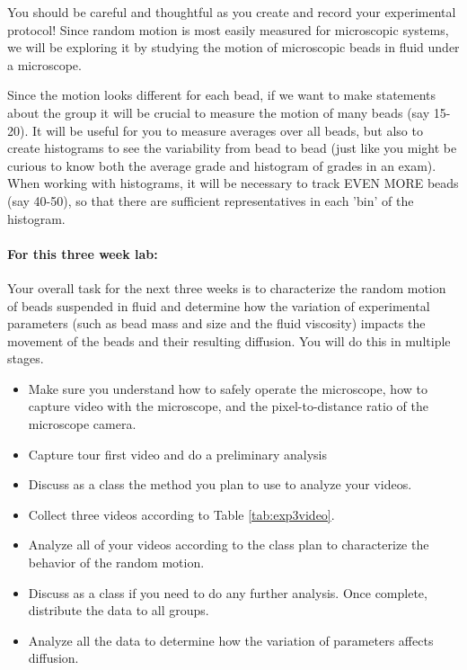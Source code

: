 You should be careful and thoughtful as you create and record your experimental protocol!
Since random motion is most easily measured for microscopic systems, we will be exploring it by studying the motion of microscopic beads in fluid under a microscope.
\par
Since the motion looks different for each bead, if we want to make statements about the group it will be crucial to measure the motion of many beads (say 15-20).
It will be useful for you to measure averages over all beads, but also to create histograms to see the variability from bead to bead (just like you might be curious to know both the average grade and histogram of grades in an exam).
When working with histograms, it will be necessary to track EVEN MORE beads (say 40-50), so that there are sufficient representatives in each 'bin' of the histogram.

\paragraph{For this three week lab:}Your overall task for the next three weeks is to characterize the random motion of beads suspended in fluid and determine how the variation of experimental parameters (such as bead mass and size and the fluid viscosity) impacts the movement of the beads and their resulting diffusion.
You will do this in multiple stages.
\begin{itemize}
\item Make sure you understand how to safely operate the microscope, how to capture video with the microscope, and the pixel-to-distance ratio of the microscope camera.
\item Capture tour first video and do a preliminary analysis
\item Discuss as a class the method you plan to use to analyze your videos.
\item Collect three videos according to Table \ref{tab:exp3video}.
\item Analyze all of your videos according to the class plan to characterize the behavior of the random motion.
\item Discuss as a class if you need to do any further analysis. Once complete, distribute the data to all groups.
\item Analyze all the data to determine how the variation of parameters affects diffusion.
\end{itemize}

